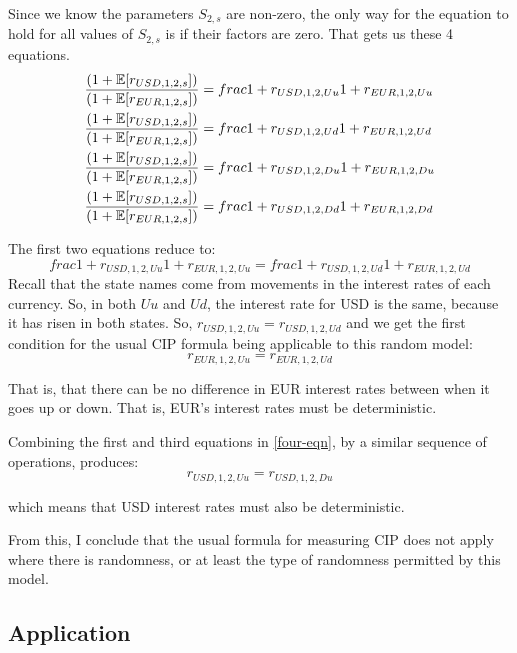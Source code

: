 Since we know the parameters $S_{2,s}$ are non-zero, the only way for the equation to hold for all values of $S_{2,s}$ is if their factors are zero.  That gets us these 4 equations.  
\begin{align}
  \label{four-eqn} 
  \frac{(1 +\operatorname{\mathbb{E}}[r_{USD,1,2,s}])}{(1 +\operatorname{\mathbb{E}}[r_{EUR,1,2,s}])} &= frac{1+r_{USD,1,2,Uu}}{1 + r_{EUR,1,2,Uu}} \\
  \frac{(1 +\operatorname{\mathbb{E}}[r_{USD,1,2,s}])}{(1 +\operatorname{\mathbb{E}}[r_{EUR,1,2,s}])} &= frac{1+r_{USD,1,2,Ud}}{1 + r_{EUR,1,2,Ud}} \\
  \frac{(1 +\operatorname{\mathbb{E}}[r_{USD,1,2,s}])}{(1 +\operatorname{\mathbb{E}}[r_{EUR,1,2,s}])} &= frac{1+r_{USD,1,2,Du}}{1 + r_{EUR,1,2,Du}} \\
  \frac{(1 +\operatorname{\mathbb{E}}[r_{USD,1,2,s}])}{(1 +\operatorname{\mathbb{E}}[r_{EUR,1,2,s}])} &= frac{1+r_{USD,1,2,Dd}}{1 + r_{EUR,1,2,Dd}} 
\end{align}

The first two equations reduce to:
\begin{equation}
frac{1+r_{USD,1,2,Uu}}{1 + r_{EUR,1,2,Uu}} = frac{1+r_{USD,1,2,Ud}}{1 + r_{EUR,1,2,Ud}}
\end{equation}
\noindent Recall that the state names come from movements in the interest rates of each currency.  So, in both $Uu$ and $Ud$, the interest rate for USD is the same, because it has risen in both states.  So, $r_{USD,1,2,Uu} = r_{USD,1,2,Ud}$ and we get the first condition for the usual CIP formula being applicable to this random model:
\begin{equation}
  r_{EUR,1,2,Uu} = r_{EUR,1,2,Ud}
\end{equation}

\noindent That is, that there can be no difference in EUR interest rates between when it goes up or down.  That is, EUR's interest rates must be deterministic.

Combining the first and third equations in \eqref{four-eqn}, by a similar sequence of operations, produces:
\begin{equation}
  r_{USD,1,2,Uu} = r_{USD,1,2,Du}
\end{equation}

\noindent which means that USD interest rates must also be deterministic.

From this, I conclude that the usual formula for measuring CIP does not apply where there is randomness, or at least the type of randomness permitted by this model.  

\subsection{Application}

